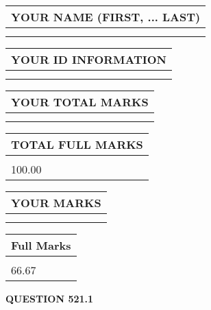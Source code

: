 \documentclass{ctexart}
\begin{document}
   
   
   
\newpage 
\setcounter{page}{ 
   521001 } 
   
   
   
   
\noindent\begin{tabular}{|l|}
\hline
YOUR NAME (FIRST, ... LAST)  \\
\hline
 \\ 
 \\ 
\hline
\end{tabular}
\hspace{0.05in} \begin{tabular}{|l|}
\hline
 YOUR   ID   INFORMATION  \\
\hline
 \\ 
 \\ 
\hline
\end{tabular}
   
   
\vspace{0.2in}\noindent\begin{tabular}{|l|}
\hline
YOUR TOTAL MARKS  \\
\hline
 \\ 
 \\ 
\hline
\end{tabular}
\hspace{0.05in} \begin{tabular}{|l|}
\hline
TOTAL FULL MARKS  \\
\hline
 \\ 
100.00 \\
\hline
\end{tabular}
   
   
 \vspace{0.2in}
 
 
 
 
   
   
  
\vspace{0.2in}
  
\noindent\begin{tabular}{|l|}
\hline
 YOUR MARKS  \\
\hline
 \\ 
 \\ 
\hline
\end{tabular}
\hspace{0.05in} \begin{tabular}{|l|}
\hline
 Full Marks  \\
\hline
 \\ 
66.67 \\
\hline
\end{tabular}
{\textbf{\Large{QUESTION
521.1 
}}}
  
\end{document}
